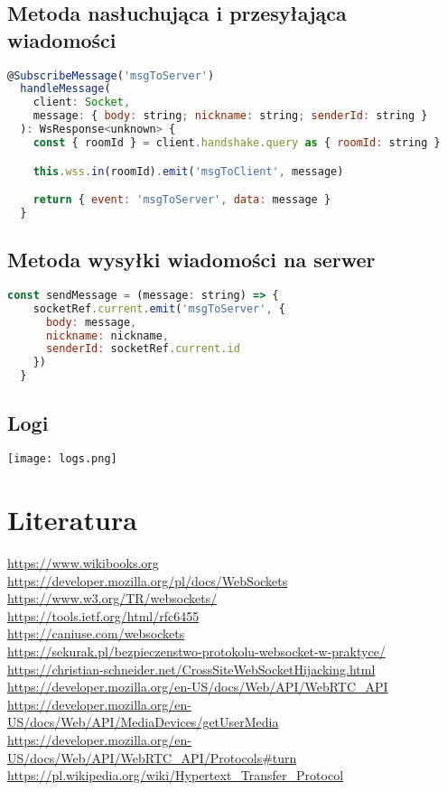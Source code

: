 \documentclass{article}
\begin{document}
\subsection{Metoda nasłuchująca i przesyłająca wiadomości}
\begin{lstlisting}[language=JavaScript]
  @SubscribeMessage('msgToServer')
  handleMessage(
    client: Socket,
    message: { body: string; nickname: string; senderId: string }
  ): WsResponse<unknown> {
    const { roomId } = client.handshake.query as { roomId: string }

    this.wss.in(roomId).emit('msgToClient', message)

    return { event: 'msgToServer', data: message }
  }
\end{lstlisting}

\subsection{Metoda wysyłki wiadomości na serwer}
\begin{lstlisting}[language=JavaScript]
  const sendMessage = (message: string) => {
    socketRef.current.emit('msgToServer', {
      body: message,
      nickname: nickname,
      senderId: socketRef.current.id
    })
  }
\end{lstlisting}

\subsection{Logi}
\texttt{[image: logs.png]}

\section{Literatura}

\url{https://www.wikibooks.org}\\
\url{https://developer.mozilla.org/pl/docs/WebSockets}\\
\url{https://www.w3.org/TR/websockets/}\\
\url{https://tools.ietf.org/html/rfc6455}\\
\url{https://caniuse.com/websockets}\\
\url{https://sekurak.pl/bezpieczenstwo-protokolu-websocket-w-praktyce/}\\
\url{https://christian-schneider.net/CrossSiteWebSocketHijacking.html}\\
\url{https://developer.mozilla.org/en-US/docs/Web/API/WebRTC_API}\\
\url{https://developer.mozilla.org/en-US/docs/Web/API/MediaDevices/getUserMedia}\\
\url{https://developer.mozilla.org/en-US/docs/Web/API/WebRTC_API/Protocols#turn}\\
\url{https://pl.wikipedia.org/wiki/Hypertext_Transfer_Protocol}
\end{document}
